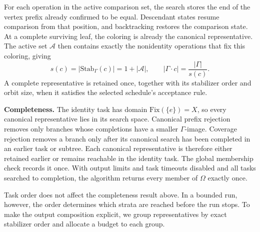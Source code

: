\documentclass[a5paper, 10pt]{article}
\begin{document}
For each operation in the active comparison set, the search stores the end of the vertex prefix already confirmed to be equal. Descendant states resume comparison from that position, and backtracking restores the comparison state. At a complete surviving leaf, the coloring is already the canonical representative. The active set $\mathcal{A}$ then contains exactly the nonidentity operations that fix this coloring, giving
\begin{equation}
 s(c)=|\mathrm{Stab}_{\Gamma}(c)|=1+|\mathcal{A}|,
 \qquad |\Gamma\cdot c|=\frac{|\Gamma|}{s(c)}.
\label{eq:active_stabilizer}
\end{equation}
A complete representative is retained once, together with its stabilizer order and orbit size, when it satisfies the selected schedule's acceptance rule.

\medskip
\noindent\textbf{Completeness.}
The identity task has domain $\mathrm{Fix}(\{e\})=X$, so every canonical representative lies in its search space. Canonical prefix rejection removes only branches whose completions have a smaller $\Gamma$-image. Coverage rejection removes a branch only after its canonical search has been completed in an earlier task or subtree. Each canonical representative is therefore either retained earlier or remains reachable in the identity task. The global membership check records it once. With output limits and task timeouts disabled and all tasks searched to completion, the algorithm returns every member of $\Omega$ exactly once.

Task order does not affect the completeness result above. In a bounded run, however, the order determines which strata are reached before the run stops. To make the output composition explicit, we group representatives by exact stabilizer order and allocate a budget to each group.
\end{document}
